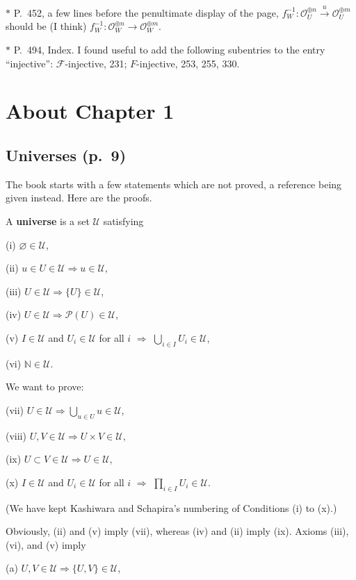 \documentclass[12pt]{article}%
\theoremstyle{remark}
\theoremstyle{definition}
\newcommand{\nn}{\noindent}
\newcommand{\cc}{\mathcal}
\newcommand{\then}{\Rightarrow}
\newcommand{\xr}{\xrightarrow}
\begin{document}
\nn$*$ P.~452, a few lines before the penultimate display of the page, $f_W^{-1}:\cc O_U^{\oplus n}\xr u\cc O_U^{\oplus m}$ should be (I think) $f_W^{-1}:\cc O_W^{\oplus n}\to\cc O_W^{\oplus m}$.

\nn$*$ P.~494, Index. I found useful to add the following subentries to the entry ``injective'': $\cc F$-injective, 231; $F$-injective, 253, 255, 330.


\section{About Chapter 1}

\subsection{Universes (p.~9)}

The book starts with a few statements which are not proved, a reference being given instead. Here are the proofs.

A \textbf{universe} is a set $\mathcal U$ satisfying 

(i) $\varnothing\in\mathcal U$,

(ii) $u\in U\in\mathcal U\then u\in \mathcal U$,

(iii) $U\in\mathcal U\then\{U\}\in\mathcal U$,

(iv) $U\in\mathcal U\then\mathcal P(U)\in\mathcal U$,

(v) $I\in\mathcal U$ and $U_i\in\mathcal U$ for all $i$ $\then$ $\bigcup_{i\in I}U_i\in\mathcal U$,

(vi) $\mathbb N\in\mathcal U$.

\nn We want to prove:

(vii) $U\in\mathcal U\then\bigcup_{u\in U}u\in\mathcal U$,

(viii) $U,V\in\mathcal U\then U\times V\in\mathcal U$,

(ix) $U\subset V\in\mathcal U\then U\in\mathcal U$,

(x) $I\in \mathcal U$ and $U_i\in\mathcal U$ for all $i$ $\then$ $\prod_{i\in I}U_i\in\mathcal U$.

\nn(We have kept Kashiwara and Schapira's numbering of Conditions (i) to (x).) 

\nn Obviously, (ii) and (v) imply (vii), whereas (iv) and (ii) imply (ix). Axioms (iii), (vi), and (v) imply

(a) $U,V\in\mathcal U\then\{U,V\}\in\mathcal U$,
\end{document}
